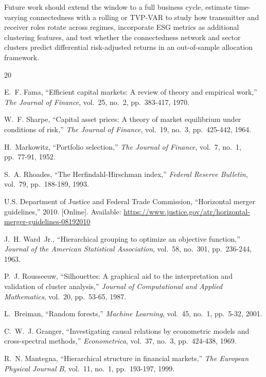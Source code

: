 \documentclass[11pt]{article}
\begin{document}
Future work should extend the window to a full business cycle, estimate time-varying connectedness with a rolling or TVP-VAR to study how transmitter and receiver roles rotate across regimes, incorporate ESG metrics as additional clustering features, and test whether the connectedness network and sector clusters predict differential risk-adjusted returns in an out-of-sample allocation framework.


\begin{thebibliography}{20}

E.~F. Fama, ``Efficient capital markets: A review of theory and empirical work,'' \textit{The Journal of Finance}, vol.~25, no.~2, pp.~383-417, 1970.

W.~F. Sharpe, ``Capital asset prices: A theory of market equilibrium under conditions of risk,'' \textit{The Journal of Finance}, vol.~19, no.~3, pp.~425-442, 1964.

H.~Markowitz, ``Portfolio selection,'' \textit{The Journal of Finance}, vol.~7, no.~1, pp.~77-91, 1952.

S.~A. Rhoades, ``The Herfindahl-Hirschman index,'' \textit{Federal Reserve Bulletin}, vol.~79, pp.~188-189, 1993.

U.S. Department of Justice and Federal Trade Commission, ``Horizontal merger guidelines,'' 2010. [Online]. Available: \url{https://www.justice.gov/atr/horizontal-merger-guidelines-08192010}

J.~H. Ward~Jr., ``Hierarchical grouping to optimize an objective function,'' \textit{Journal of the American Statistical Association}, vol.~58, no.~301, pp.~236-244, 1963.

P.~J. Rousseeuw, ``Silhouettes: A graphical aid to the interpretation and validation of cluster analysis,'' \textit{Journal of Computational and Applied Mathematics}, vol.~20, pp.~53-65, 1987.

L.~Breiman, ``Random forests,'' \textit{Machine Learning}, vol.~45, no.~1, pp.~5-32, 2001.

C.~W.~J. Granger, ``Investigating causal relations by econometric models and cross-spectral methods,'' \textit{Econometrica}, vol.~37, no.~3, pp.~424-438, 1969.

R.~N. Mantegna, ``Hierarchical structure in financial markets,'' \textit{The European Physical Journal B}, vol.~11, no.~1, pp.~193-197, 1999.


\end{thebibliography}
\end{document}
